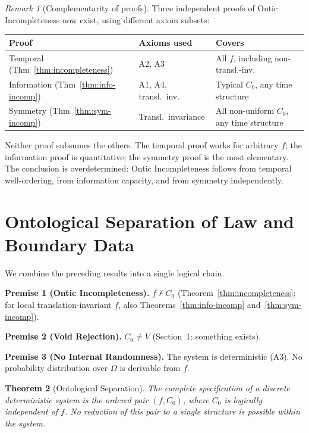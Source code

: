 \documentclass[12pt]{article}
\theoremstyle{plain}
\newtheorem{theorem}{Theorem}[section]
\theoremstyle{definition}
\theoremstyle{remark}
\newtheorem{remark}[theorem]{Remark}
\begin{document}
\begin{remark}[Complementarity of proofs]\label{rem:complementarity}
Three independent proofs of Ontic Incompleteness now exist, using different axiom subsets:
\begin{center}\small
\begin{tabular}{@{}lll@{}}
\toprule
\textbf{Proof} & \textbf{Axioms used} & \textbf{Covers} \\
\midrule
Temporal (Thm~\ref{thm:incompleteness}) & A2, A3 & All $f$, including non-transl.-inv. \\
Information (Thm~\ref{thm:info-incomp}) & A1, A4, transl.\ inv. & Typical $C_0$, any time structure \\
Symmetry (Thm~\ref{thm:sym-incomp}) & Transl.\ invariance & All non-uniform $C_0$, any time structure \\
\bottomrule
\end{tabular}
\end{center}
Neither proof subsumes the others. The temporal proof works for arbitrary $f$; the information proof is quantitative; the symmetry proof is the most elementary. The conclusion is overdetermined: Ontic Incompleteness follows from temporal well-ordering, from information capacity, and from symmetry independently.
\end{remark}


\section{Ontological Separation of Law and Boundary Data}

We combine the preceding results into a single logical chain.

\medskip
\noindent\textbf{Premise 1 (Ontic Incompleteness).} $f \nvdash C_0$ (Theorem~\ref{thm:incompleteness}; for local translation-invariant $f$, also Theorems~\ref{thm:info-incomp} and~\ref{thm:sym-incomp}).

\noindent\textbf{Premise 2 (Void Rejection).} $C_0 \neq V$ (Section~1: something exists).

\noindent\textbf{Premise 3 (No Internal Randomness).} The system is deterministic (A3). No probability distribution over $\Omega$ is derivable from $f$.

\begin{theorem}[Ontological Separation]\label{thm:separation}
The complete specification of a discrete deterministic system is the ordered pair $(f, C_0)$, where $C_0$ is logically independent of $f$. No reduction of this pair to a single structure is possible within the system.
\end{theorem}
\end{document}
